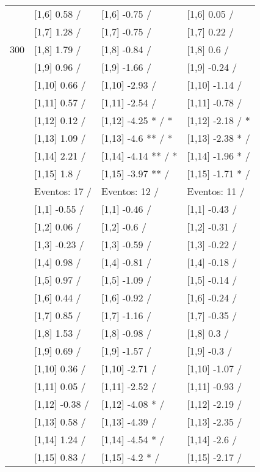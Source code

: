 \begin{table}
\begin{tabular}[t]{llll}
 & {}[1,6] 0.58  / & {}[1,6] -0.75  / & {}[1,6] 0.05  /\\
 & {}[1,7] 1.28  / & {}[1,7] -0.75  / & {}[1,7] 0.22  /\\
300 & {}[1,8] 1.79  / & {}[1,8] -0.84  / & {}[1,8] 0.6  /\\
\addlinespace
 & {}[1,9] 0.96  / & {}[1,9] -1.66  / & {}[1,9] -0.24  /\\
 & {}[1,10] 0.66  / & {}[1,10] -2.93  / & {}[1,10] -1.14  /\\
 & {}[1,11] 0.57  / & {}[1,11] -2.54  / & {}[1,11] -0.78  /\\
 & {}[1,12] 0.12  / & {}[1,12] -4.25 * / * & {}[1,12] -2.18  / *\\
 & {}[1,13] 1.09  / & {}[1,13] -4.6 ** / * & {}[1,13] -2.38 * /\\
\addlinespace
 & {}[1,14] 2.21  / & {}[1,14] -4.14 ** / * & {}[1,14] -1.96 * /\\
 & {}[1,15] 1.8  / & {}[1,15] -3.97 ** / & {}[1,15] -1.71 * /\\
 & Eventos:  17 / & Eventos:  12 / & Eventos:  11 /\\
 & {}[1,1] -0.55  / & {}[1,1] -0.46  / & {}[1,1] -0.43  /\\
 & {}[1,2] 0.06  / & {}[1,2] -0.6  / & {}[1,2] -0.31  /\\
\addlinespace
 & {}[1,3] -0.23  / & {}[1,3] -0.59  / & {}[1,3] -0.22  /\\
 & {}[1,4] 0.98  / & {}[1,4] -0.81  / & {}[1,4] -0.18  /\\
 & {}[1,5] 0.97  / & {}[1,5] -1.09  / & {}[1,5] -0.14  /\\
 & {}[1,6] 0.44  / & {}[1,6] -0.92  / & {}[1,6] -0.24  /\\
 & {}[1,7] 0.85  / & {}[1,7] -1.16  / & {}[1,7] -0.35  /\\
\addlinespace
500 & {}[1,8] 1.53  / & {}[1,8] -0.98  / & {}[1,8] 0.3  /\\
 & {}[1,9] 0.69  / & {}[1,9] -1.57  / & {}[1,9] -0.3  /\\
 & {}[1,10] 0.36  / & {}[1,10] -2.71  / & {}[1,10] -1.07  /\\
 & {}[1,11] 0.05  / & {}[1,11] -2.52  / & {}[1,11] -0.93  /\\
 & {}[1,12] -0.38  / & {}[1,12] -4.08 * / & {}[1,12] -2.19  /\\
\addlinespace
 & {}[1,13] 0.58  / & {}[1,13] -4.39  / & {}[1,13] -2.35  /\\
 & {}[1,14] 1.24  / & {}[1,14] -4.54 * / & {}[1,14] -2.6  /\\
 & {}[1,15] 0.83  / & {}[1,15] -4.2 * / & {}[1,15] -2.17  /\\
\bottomrule
\end{tabular}
\end{table}
